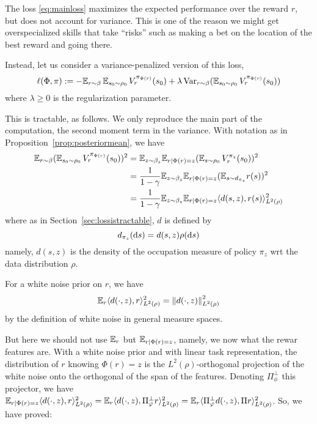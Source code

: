 \documentclass[11pt,a4paper]{article}
\begin{document}
The loss \eqref{eq:mainloss} maximizes the expected performance over the
reward $r$, but does not account for variance. This is one of the reason
we might get overspecialized skills that take ``risks'' such as making
a bet on the location of the best reward and going there.

Instead, let us consider a variance-penalized version of this loss,
\begin{equation}
\label{eq:mainlosspen}
\ell(\Phi,\pi)\mathrel{\mathop{:}}= - \mathbb{E}_{r\sim \beta}\, \mathbb{E}_{s_0\sim \rho_0}\,
V^{\pi_{\Phi(r)}}_r(s_0) + \lambda \operatorname{Var}_{r\sim \beta} (\mathbb{E}_{s_0\sim \rho_0}\,
V^{\pi_{\Phi(r)}}_r(s_0))
\end{equation}
where $\lambda\geq 0$ is the regularization parameter.

This is tractable, as follows. We only reproduce the main part of the
computation, the second moment term in the variance. With notation as in
Proposition~\ref{prop:posteriormean}, we have
\begin{align}
\mathbb{E}_{r\sim\beta} (\mathbb{E}_{s_0\sim \rho_0}\,
V^{\pi_{\Phi(r)}}_r(s_0))^2
&=
\mathbb{E}_{z\sim \beta_z} \mathbb{E}_{r| \Phi(r)=z} (\mathbb{E}_{s\sim \rho_0}\,
V^{\pi_z}_r(s_0))^2
\\&=\frac{1}{1-\gamma}
\mathbb{E}_{z\sim \beta_z} \mathbb{E}_{r| \Phi(r)=z} (
\mathbb{E}_{s\sim d_{\pi_z}} r(s)
)^2
\\&=\frac{1}{1-\gamma}
\mathbb{E}_{z\sim \beta_z} \mathbb{E}_{r| \Phi(r)=z} \langle d(s,z),r(s)\rangle_{L^2(\rho)}^2
\end{align}
where as in Section~\ref{sec:lossistractable}, $d$ is defined by
\begin{equation}
d_{\pi_z}(\operatorname{d}\!{} s)=d(s,z)\rho(\operatorname{d}\!{} s)
\end{equation}
namely, $d(s,z)$ is the density of the occupation measure of policy $\pi_z$
wrt the data distribution $\rho$.

For a white noise prior on $r$,
we have 
\begin{equation}
\mathbb{E}_r \langle d(\cdot,z),r\rangle_{L^2(\rho)}^2= \left\lVert d(\cdot,z)\right\rVert^2_{L^2(\rho)}
\end{equation}
by the definition of white noise in general measure spaces.

But here we should not use $\mathbb{E}_r$ but $\mathbb{E}_{r|\Phi(r)=z}$, namely, we now
what the rewar features are. With a white noise prior and with linear
task representation, the distribution of $r$ knowing $\Phi(r)=z$ is the
$L^2(\rho)$-orthogonal projection of the white noise onto the orthogonal of the span of the
features. Denoting $\Pi^\bot_\phi$ this projector, we have
$\mathbb{E}_{r|\Phi(r)=z} \langle
d(\cdot,z),r\rangle_{L^2(\rho)}^2=\mathbb{E}_r \langle
d(\cdot,z),\Pi^\bot_\varphi r\rangle_{L^2(\rho)}^2=\mathbb{E}_r \langle
\Pi^\bot_\varphi d(\cdot,z),\Pi r\rangle_{L^2(\rho)}^2$. So, we have proved:
\end{document}
